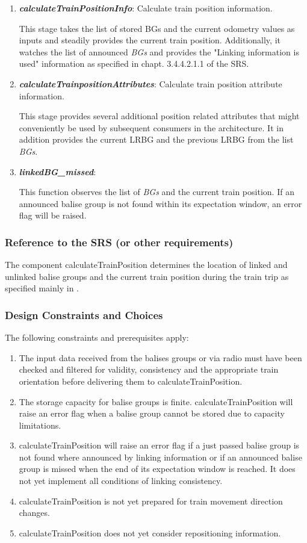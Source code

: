 \begin{enumerate}
\item \textbf{\textit{calculateTrainPositionInfo}}: Calculate train position information.

This stage takes the list of stored BGs and the current odometry values as inputs and steadily provides the current train position. Additionally, it watches the list of announced \textit{BGs} and provides the "Linking information is used" information as specified in chapt. 3.4.4.2.1.1 of the SRS. 

\item \textbf{\textit{calculateTrainpositionAttributes}}: Calculate train position attribute information.

This stage provides several additional position related attributes that might conveniently be used by subsequent consumers in the architecture. It in addition provides the current LRBG and the previous LRBG from the list \textit{BGs}. 

\item \textbf{\textit{linkedBG\_missed}}:

This function observes the list of \textit{BGs} and the current train position. If an announced balise group is not found within its expectation window, an error flag will be raised. 
\end{enumerate}


\subsubsection{Reference to the SRS (or other requirements)}
The component calculateTrainPosition determines the location of linked and unlinked balise groups and the current train position during the train trip as specified mainly in \cite[Chapter~3.6]{subset-026}.

\subsubsection{Design Constraints and Choices}
The following constraints and prerequisites apply:
\begin{enumerate}
\item The input data received from the balises groups or via radio must have been checked and filtered for validity, consistency and the appropriate train orientation before delivering them to calculateTrainPosition. 
\item The storage capacity for balise groups is finite. calculateTrainPosition will raise an error flag when a balise group cannot be stored due to capacity limitations.
\item calculateTrainPosition will raise an error flag if a just passed balise group is not found where announced by linking information or if an announced balise group is missed when the end of its expectation window is reached. It does not yet implement all conditions of linking consistency.
\item calculateTrainPosition is not yet prepared for train movement direction changes. 
\item calculateTrainPosition does not yet consider repositioning information.
\end{enumerate}



